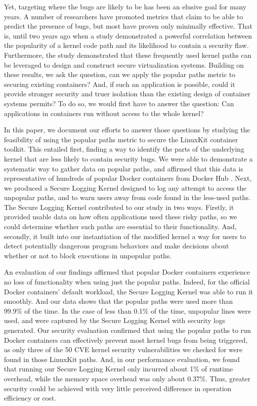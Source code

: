 Yet, targeting where the bugs are likely to be has been an elusive goal for many years. 
A number of researchers have promoted metrics \cite{Chou, Ozment} that claim to be able to predict the presence of bugs, but most have proven only minimally effective. 
That is, until two years ago when a study \cite{Lock-in-Pop} demonstrated a powerful correlation between the popularity of a kernel code path and its likelihood to contain a security flaw. 
Furthermore, the study \cite{Lock-in-Pop} demonstrated that these frequently used kernel paths can be leveraged to design and construct secure virtualization systems. 
Building on these results, we ask the question, can we apply the popular paths metric to  securing existing containers? 
And, if such an application is possible, could it provide stronger security and truer isolation than the existing design of container systems permits? 
To do so, we would first have to answer the question: Can applications in containers run without access to the whole kernel?

In this paper, we document our efforts to answer those questions by studying the feasibility of using the popular paths metric to secure the LinuxKit container toolkit. 
This entailed first, finding a way to identify the parts of the underlying kernel that are less likely to contain security bugs. We were able to demonstrate a systematic way to gather data on popular paths, 
and affirmed that this data is representative of hundreds of popular Docker containers from Docker Hub \cite{DockerHub}. 
Next, we produced a Secure Logging Kernel designed to log any attempt to access the unpopular paths, and to warn users away from code found in the less-used paths. 
The Secure Logging Kernel contributed to our study in two ways. Firstly, it provided usable data on how often applications used these risky paths, 
so we could determine whether such paths are essential to their functionality. 
And, secondly, it built into our instantiation of the modified kernel a way for users to detect potentially dangerous program behaviors and make decisions about whether or not to block executions in unpopular paths. 

An evaluation of our findings affirmed that popular Docker containers experience no loss of functionality when using just the popular paths. 
Indeed, for the official Docker containers’ default workload, the Secure Logging Kernel was able to run it smoothly. 
And our data shows that the popular paths were used more than 99.9\% of the time. In the case of less than 0.1\% of the time, unpopular lines were used, 
and were captured by the Secure Logging Kernel with security logs generated. 
Our security evaluation confirmed that using the popular paths to run Docker containers can effectively prevent most kernel bugs from being triggered, 
as only three of the 50 CVE kernel security vulnerabilities we checked for were found in those LinuxKit paths. 
And, in our performance evaluation, we found that running our Secure Logging Kernel only incurred about 1\% of runtime overhead, while the memory space overhead was only about 0.37\%. 
Thus, greater security could be achieved with very little perceived difference in operation efficiency or cost. 

